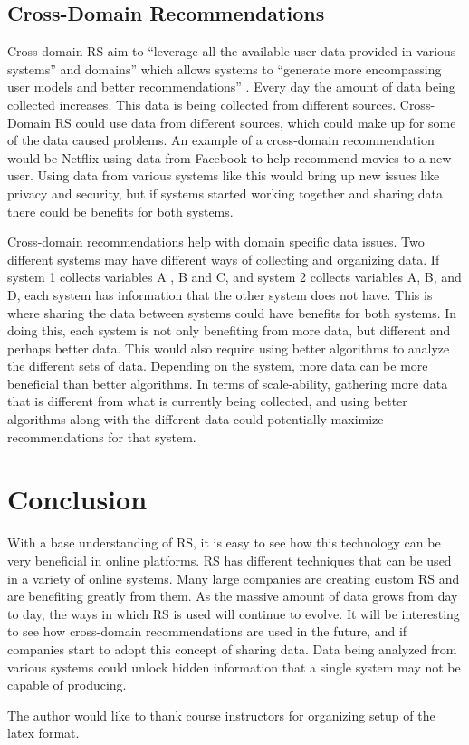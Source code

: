 \documentclass[sigconf]{acmart}
\begin{document}
\subsection{Cross-Domain Recommendations}
Cross-domain RS aim to ``leverage all the available user data provided in various systems''  and
domains'' which allows systems to ``generate more encompassing user models and better recommendations'' \cite{Cantador2015}. 
Every day the amount of data being collected increases. This data is being collected from different sources. 
Cross-Domain RS could use data from different sources, which could make up for some of the data caused
problems. An example of a cross-domain recommendation would be Netflix using data from Facebook to help
recommend movies to a new user. Using data from various systems like this would bring up new issues like
privacy and security, but if systems started working together and sharing data there could be benefits for both
systems. 

Cross-domain recommendations help with domain specific data issues. Two different systems may have different
ways of collecting and organizing data. If system 1 collects variables A , B and C, and system 2 collects
variables A, B, and D, each system has information that the other system does not have. This is where sharing
the data between systems could have benefits for both systems. In doing this, each system is not only
benefiting from more data, but different and perhaps better data. This would also require using better
algorithms to analyze the different sets of data. Depending on the system, more data  can be more beneficial
than better algorithms. In terms of scale-ability, gathering more data that is different from what is currently
being collected, and using better algorithms along with the different data could potentially maximize
recommendations for that system. 

\section{Conclusion}
With a base understanding of RS, it is easy to see how this technology can be very beneficial in online
platforms. RS has different techniques that can be used in a variety of online systems.  Many large companies
are creating custom RS and are benefiting greatly from them. As the massive amount of data grows from day to
day, the ways in which RS is used will continue to evolve. It will be interesting to see how cross-domain
recommendations are used in the future, and if companies start to adopt this concept of sharing data. Data
being analyzed from various systems could unlock hidden information that a single system may not be capable of
producing.  
\begin{acks}

  The author would like to thank course instructors for organizing setup of the latex format. 

\end{acks}


 
\end{document}
